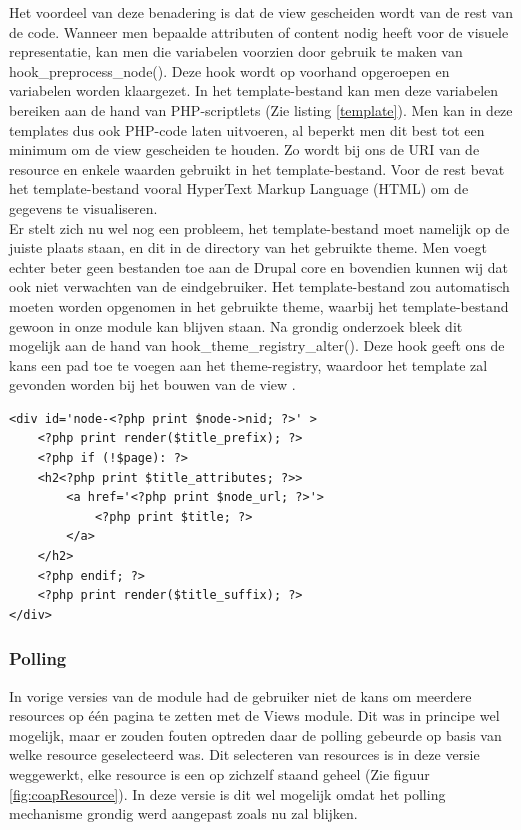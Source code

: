 Het voordeel van deze benadering is dat de view gescheiden wordt van de rest van de code. Wanneer men bepaalde attributen of content nodig heeft voor de visuele representatie, kan men die variabelen voorzien door gebruik te maken van hook\_preprocess\_node(). Deze hook wordt op voorhand opgeroepen en variabelen worden klaargezet. In het template-bestand kan men deze variabelen bereiken aan de hand van PHP-scriptlets (Zie listing \ref{template}). Men kan in deze templates dus ook PHP-code laten uitvoeren, al beperkt men dit best tot een minimum om de view gescheiden te houden. Zo wordt bij ons de URI van de resource en enkele waarden gebruikt in het template-bestand. Voor de rest bevat het template-bestand vooral HyperText Markup Language (HTML)  om de gegevens te visualiseren.\\

Er stelt zich nu wel nog een probleem, het template-bestand moet namelijk op de juiste plaats staan, en dit in de directory van het gebruikte theme. Men voegt echter beter geen bestanden toe aan de Drupal core en bovendien kunnen wij dat ook niet verwachten van de eindgebruiker. Het template-bestand zou automatisch moeten worden opgenomen in het gebruikte theme, waarbij het template-bestand gewoon in onze module kan blijven staan. Na grondig onderzoek bleek dit mogelijk aan de hand van hook\_theme\_registry\_alter(). Deze hook geeft ons de kans een pad toe te voegen aan het theme-registry, waardoor het template zal gevonden worden bij het bouwen van de view \cite{addTemplate}.

\lstset{language=HTML}
\begin{lstlisting}[label=template,caption=Voorbeeld van een template met PHP-scriptlets (node.tpl.php)]
<div id='node-<?php print $node->nid; ?>' >
	<?php print render($title_prefix); ?>
	<?php if (!$page): ?>
	<h2<?php print $title_attributes; ?>>
		<a href='<?php print $node_url; ?>'>
			<?php print $title; ?>
		</a>
	</h2>
	<?php endif; ?>
	<?php print render($title_suffix); ?>
</div>
\end{lstlisting}

\noindent

\subsubsection{Polling}\label{polling}
In vorige versies van de module had de gebruiker niet de kans om meerdere resources op \'{e}\'{e}n pagina te zetten met de Views module. Dit was in principe wel mogelijk, maar er zouden fouten optreden daar de polling gebeurde op basis van welke resource geselecteerd was. Dit selecteren van resources is in deze versie weggewerkt, elke resource is een op zichzelf staand geheel (Zie figuur \ref{fig:coapResource}). In deze versie is dit wel mogelijk omdat het polling mechanisme grondig werd aangepast zoals nu zal blijken.\\

